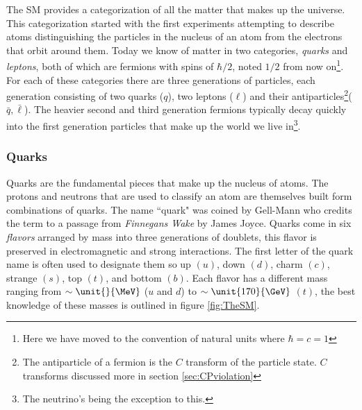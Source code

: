 The SM provides a categorization of all the matter that makes up the universe. This categorization started with the first experiments attempting to describe atoms distinguishing the particles in the nucleus of an atom from the electrons that orbit around them. Today we know of matter in two categories, \textit{quarks} and \textit{leptons}, both of which are fermions with spins of $\hbar/2$, noted $1/2$ from now on\footnote{Here we have moved to the convention of natural units where $\hbar = c = 1$}. For each of these categories there are three generations of particles, each generation consisting of two quarks ($q$), two leptons ($\ell$) and their antiparticles\footnote{The antiparticle of a fermion is the $C$ transform of the particle state. $C$ transforms discussed more in section \ref{sec:CPviolation}}($\bar{q}, \bar{\ell}$). The heavier second and third generation fermions typically decay quickly into the first generation particles that make up the world we live in\footnote{The neutrino's being the exception to this.}.

\subsubsection{Quarks}
\label{sec:TheQuarks}

Quarks are the fundamental pieces that make up the nucleus of atoms. The protons and neutrons that are used to classify an atom are themselves built form combinations of quarks. The name ``quark" was coined by Gell-Mann who credits the term to a passage from \textit{Finnegans Wake} by James Joyce. Quarks come in six \textit{flavors} arranged by mass into three generations of doublets, this flavor is preserved in electromagnetic and strong interactions. The first letter of the quark name is often used to designate them so up $\left(u\right)$, down $\left(d\right)$, charm $\left(c\right)$, strange $\left(s\right)$, top $\left(t\right)$, and bottom $\left(b\right)$. Each flavor has a different mass ranging from $\sim\unit{}{\MeV}$ ($u$ and $d$) to $\sim\unit{170}{\GeV}$ $\left(t\right)$, the best knowledge of these masses is outlined in figure \ref{fig:TheSM}.

